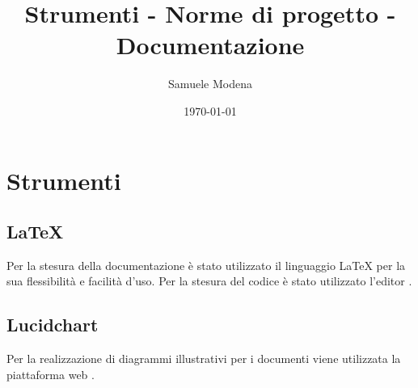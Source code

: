 \documentclass[openany,12pt,a4paper]{report}
\title{Strumenti - Norme di progetto - Documentazione}
\author{Samuele Modena}
\date{\today}
\begin{document}
\section{Strumenti}

\subsection{\LaTeX{}}

Per la stesura della documentazione è stato utilizzato il linguaggio \LaTeX{} per la sua flessibilità e facilità d'uso.
Per la stesura del codice è stato utilizzato l’editor .

\subsection{Lucidchart}

Per la realizzazione di diagrammi illustrativi per i documenti viene utilizzata la piattaforma web .
\end{document}
